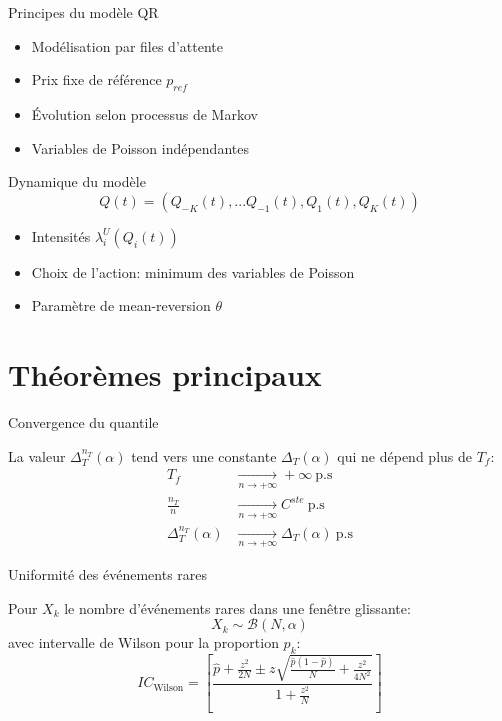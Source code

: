 \documentclass[aspectratio=169]{beamer}  %
\begin{document}
\begin{frame}{Principes du modèle QR}
    \begin{itemize}
        \item Modélisation par files d'attente
        \item Prix fixe de référence $p_{ref}$
        \item Évolution selon processus de Markov
        \item Variables de Poisson indépendantes
    \end{itemize}
\end{frame}

\begin{frame}{Dynamique du modèle}
    \begin{equation*}
        Q(t) = (Q_{-K}(t),...Q_{-1}(t),Q_{1}(t),Q_K(t))
    \end{equation*}
    \begin{itemize}
        \item Intensités $\lambda_i^U(Q_i(t))$
        \item Choix de l'action: minimum des variables de Poisson
        \item Paramètre de mean-reversion $\theta$
    \end{itemize}
\end{frame}

\section{Théorèmes principaux}

\begin{frame}{Convergence du quantile}
    \begin{theorem}
        La valeur $\Delta_T^{n_T}(\alpha)$ tend vers une constante $\Delta_T(\alpha)$ qui ne dépend plus de $T_f$:
        \begin{align*}
            T_f &\underset{n\to +\infty}{\to}+\infty \ \text{p.s} \\
            \frac{n_T}{n} &\underset{n\to +\infty}{\to}C^{ste} \ \text{p.s} \\
            \Delta_T^{n_T}(\alpha) &\underset{n\to +\infty}{\to}\Delta_T(\alpha) \ \text{p.s}
        \end{align*}
    \end{theorem}
\end{frame}

\begin{frame}{Uniformité des événements rares}
    \begin{theorem}
        Pour $X_k$ le nombre d'événements rares dans une fenêtre glissante:
        \[X_k \sim \mathcal{B}(N, \alpha)\]
        avec intervalle de Wilson pour la proportion $p_k$:
        \[IC_{\text{Wilson}} = \left[ \frac{\hat{p} + \frac{z^2}{2N} \pm z \sqrt{\frac{\hat{p}(1-\hat{p})}{N} + \frac{z^2}{4N^2}}}{1 + \frac{z^2}{N}} \right]\]
    \end{theorem}
\end{frame}
\end{document}
